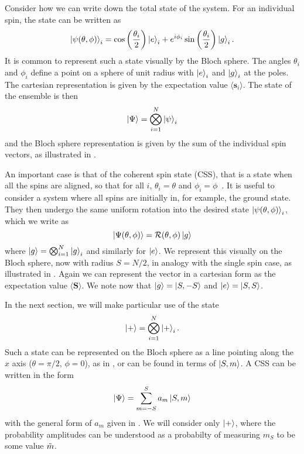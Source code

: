 Consider how we can write down the total state of the system. For an individual
spin, the state can be written as
%
\begin{equation}
  \ket{\psi(\theta, \phi)}_i = \cos\left(\frac{\theta_i}{2}\right)\ket{e}_i +
  e^{i\phi_i}\sin\left(\frac{\theta_i}{2}\right)\ket{g}_i.
  \label{eqn:blochspin}
\end{equation}
%
It is common to represent such a state visually by the Bloch sphere.
The angles $\theta_i$ and $\phi_i$ define a point on a sphere of unit
radius with $\ket{e}_i$ and $\ket{g}_i$ at the poles. The cartesian
representation is given by the expectation value $\langle \mathbf{s}_i
\rangle$.
%
The state of the ensemble is then
%
\begin{equation}
  \ket{\Psi} = \bigotimes_{i=1}^N \ket{\psi}_i
\end{equation}
%
and the Bloch sphere representation is given by the sum of the individual spin
vectors, as illustrated in .

An important case is that of the coherent spin state (CSS), that is a
state when all the spins are aligned, so that for all $i$, $\theta_i = \theta$
and $\phi_i = \phi$~\cite{MA201189, Gazeau2009}.
It is useful to consider a system where all spins are initially
in, for example, the ground state. They then undergo the same uniform rotation
into the desired state $\ket{\psi(\theta, \phi)}_i$, which we write as
%
\begin{equation}
  \ket{\Psi(\theta,\phi)} = \mathcal{R}(\theta, \phi)\ket{g}
\end{equation}
%
where $\ket{g} = \bigotimes_{i=1}^N\ket{g}_i$ and similarly for $\ket{e}$. We
represent this visually on the Bloch sphere, now with radius $S=N/2$, in
analogy with the single spin case, as illustrated in . Again
we can represent the vector in a cartesian form as the expectation value
$\langle \mathbf{S} \rangle$. 
%
We note now that $\ket{g} = \ket{S,-S}$ and $\ket{e}=\ket{S,S}$.


In the next section, we will make particular use of the state
%
\begin{equation}
  \ket{+} = \bigotimes_{i=1}^N \ket{+}_i.
\end{equation}
%
Such a state can be represented on the Bloch sphere as a line pointing along
the $x$ axis ($\theta=\pi/2$, $\phi=0$), as in , or can be
found in terms of $\ket{S,m}$. A CSS can be written in the form 
%
\begin{equation}
  \ket{\Psi} = \sum_{m=-S}^S a_m \ket{S, m}
\end{equation}
%
with the general form of $a_m$ given in . We will
consider only $\ket{+}$, where the probability amplitudes can be understood as
a probabilty of measuring $m_S$ to be some value $\tilde{m}$.

